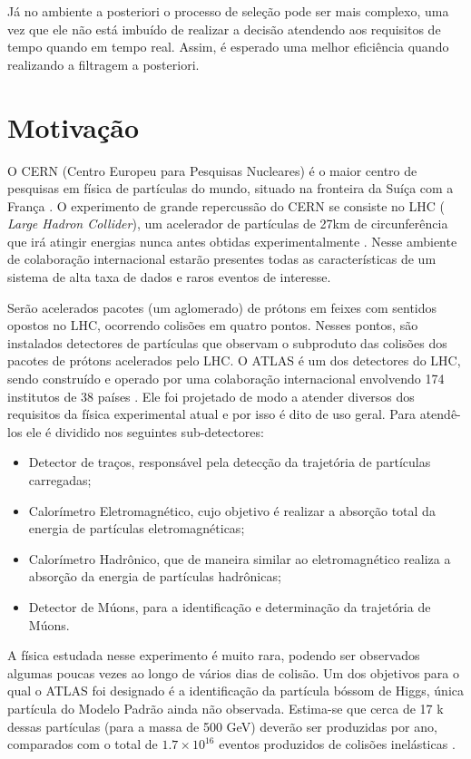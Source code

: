 Já no ambiente a posteriori o processo de seleção pode ser mais
complexo, uma vez que ele não está imbuído de realizar a decisão atendendo aos
requisitos de tempo quando em tempo real. Assim, é esperado 
uma melhor eficiência quando realizando a filtragem a posteriori.

\section{Motivação} 

O CERN (Centro Europeu para Pesquisas Nucleares) é o maior centro de
pesquisas em física de partículas do mundo, situado na fronteira da Suíça com a
França \cite{webCERN}. O experimento de grande repercussão do CERN se consiste no LHC ({\it
Large Hadron Collider}), um acelerador de partículas de 27km de
circunferência que irá atingir energias nunca antes obtidas
experimentalmente \cite{webLHC}. 
Nesse ambiente de colaboração internacional estarão presentes
todas as características de um sistema de alta taxa de dados e raros eventos de
interesse.

Serão acelerados pacotes (um aglomerado) de prótons em feixes com sentidos opostos no LHC,
ocorrendo colisões em quatro pontos. Nesses pontos, são instalados 
detectores de partículas que observam o subproduto das colisões dos pacotes de prótons 
acelerados pelo LHC. O ATLAS é um dos detectores do LHC, sendo construído e operado por 
uma colaboração internacional envolvendo 174 institutos de 38
países \cite{webATLAS}. Ele foi projetado 
de modo a atender diversos dos requisitos da física experimental atual e por isso é dito de uso
geral. Para atendê-los ele é dividido nos seguintes sub-detectores:

\begin{itemize}
\item Detector de traços, responsável pela detecção da trajetória de partículas carregadas;
\item Calorímetro Eletromagnético, cujo objetivo é realizar a absorção total da
energia de partículas eletromagnéticas;
\item Calorímetro Hadrônico, que de maneira similar ao eletromagnético realiza a
absorção da energia de partículas hadrônicas;
\item Detector de Múons, para a identificação e determinação da trajetória de
Múons.
\end{itemize}

A física estudada nesse experimento é muito rara, podendo ser observados algumas
poucas vezes ao longo de vários dias de colisão. Um dos objetivos para o qual o
ATLAS foi designado é a identificação da partícula bóssom de Higgs, única partícula 
do Modelo Padrão ainda não observada. Estima-se que cerca de 17 k dessas
partículas (para a massa de 500 GeV) deverão ser produzidas por ano, comparados
com o total de $1.7\times10^{16}$ eventos produzidos de colisões inelásticas \cite{resumo_ATLAS}. 

